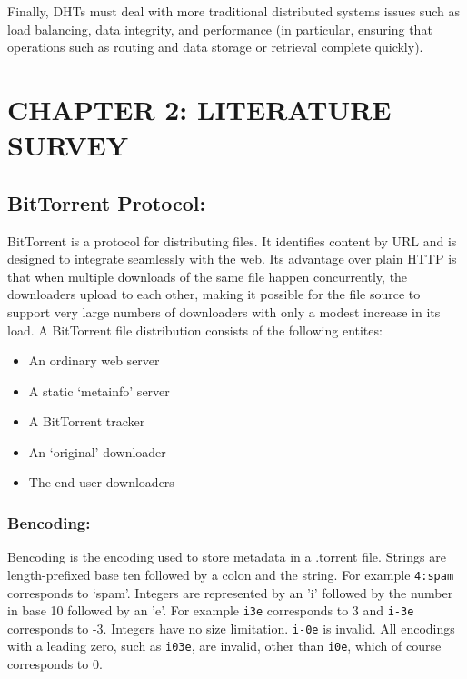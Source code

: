 \documentclass[a4paper,12pt]{article}
\begin{document}
Finally, DHTs must deal with more traditional distributed systems issues such as load balancing, data integrity, and performance (in particular, ensuring that operations such as routing and data storage or retrieval complete quickly).

\clearpage
\section{\large CHAPTER 2: LITERATURE SURVEY}

\subsection{BitTorrent Protocol:}

BitTorrent is a protocol for distributing files. It identifies content by URL and is designed to integrate seamlessly with the web. Its advantage over plain HTTP is that when multiple downloads of the same file happen concurrently, the downloaders upload to each other, making it possible for the file source to support very large numbers of downloaders with only a modest increase in its load. A BitTorrent file distribution consists of the following entites:

\begin{itemize}
\itemsep0em

\item An ordinary web server

\item A static `metainfo' server

\item A BitTorrent tracker

\item An `original' downloader

\item The end user downloaders

\end{itemize}

\subsubsection{Bencoding:}

Bencoding is the encoding used to store metadata in a .torrent file. Strings are length-prefixed base ten followed by a colon and the string. For example \texttt{4:spam} corresponds to `spam'. Integers are represented by an 'i' followed by the number in base 10 followed by an 'e'. For example \texttt{i3e} corresponds to 3 and \texttt{i-3e} corresponds to -3. Integers have no size limitation. \texttt{i-0e} is invalid. All encodings with a leading zero, such as \texttt{i03e}, are invalid, other than \texttt{i0e}, which of course corresponds to 0. 
\end{document}
